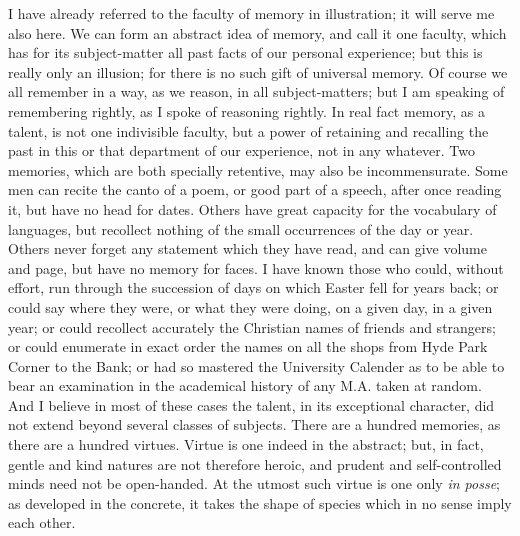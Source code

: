 I have already referred to the faculty of memory in illustration;
it will serve me also here. We can form an abstract idea of memory,
and call it one faculty, which has for its subject-matter all past
facts of our personal experience; but this is really only an illusion;
for there is no such gift of universal memory. Of course we all
remember in a way, as we reason, in all subject-matters; but I am
speaking of remembering rightly, as I spoke of reasoning rightly. In
real fact memory, as a talent, is not one indivisible faculty, but a
power of retaining and recalling the past in this or that department
of our experience, not in any whatever. Two memories, which are both
specially retentive, may also be incommensurate. Some men can recite
the canto of a poem, or good part of a speech, after once reading it,
but have no head for dates. Others have great capacity for the
vocabulary of languages, but recollect nothing of the small
occurrences of the day or year. Others never forget any statement
which they have read, and can give volume and page, but have no memory for faces. I have known those who could, without effort, run
through the succession of days on which Easter fell for years back; or
could say where they were, or what they were doing, on a given day, in
a given year; or could recollect accurately the Christian names of
friends and strangers; or could enumerate in exact order the names on
all the shops from Hyde Park Corner to the Bank; or had so mastered
the University Calender as to be able to bear an examination in the
academical history of any M.A. taken at random. And I believe in most
of these cases the talent, in its exceptional character, did not
extend beyond several classes of subjects. There are a hundred
memories, as there are a hundred virtues. Virtue is one indeed in the
abstract; but, in fact, gentle and kind natures are not therefore
heroic, and prudent and self-controlled minds need not be open-handed.
At the utmost such virtue is one only \emph{in posse}; as developed in
the concrete, it takes the shape of species which in no sense imply
each other.

